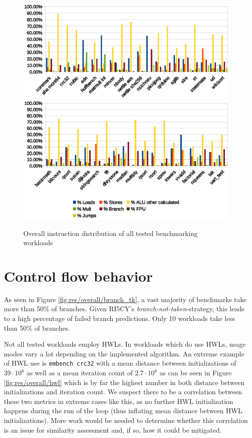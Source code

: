 \documentclass[../bachelor_paper.tex]{subfiles}
\begin{document}
\begin{figure}
    \centering
    \includegraphics[width=\textwidth]{img/graph/overall_inst_dist}
    \includegraphics[width=\textwidth]{img/graph/overall_inst_dist2}
    \caption{Overall instruction distribution of all tested benchmarking workloads}
    \label{fig:res/overall/inst}
\end{figure}

\section{Control flow behavior}
    \label{sec:res/control}
As seen in Figure \ref{fig:res/overall/branch_tk}, a vast majority of benchmarks take more than 50\% of branches. Given RI5CY's \emph{branch-not-taken}-strategy, this leads to a high percentage of failed branch predictions. Only 10 workloads take less than 50\% of branches.

Not all tested workloads employ \acp{HWL}. In workloads which do use \acp{HWL}, usage modes vary a lot depending on the implemented algorithm. An extreme example of \ac{HWL} use is \texttt{embench crc32} with a mean distance between initializations of $39 \cdot 10^6$ as well as a mean iteration count of $2.7 \cdot 10^6$ as can be seen in Figure \ref{fig:res/overall/hwl} which is by far the highest number in both distance between initializations and iteration count. We suspect there to be a correlation between these two metrics in extreme cases like this, as no further \ac{HWL} initialization happens during the run of the loop (thus inflating mean distance between \ac{HWL} initializations). More work would be needed to determine whether this correlation is an issue for similarity assessment and, if so, how it could be mitigated.
\end{document}
